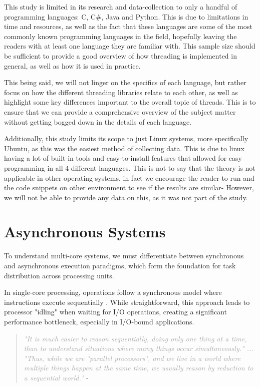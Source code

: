 \documentclass[12pt,a4paper]{article}
\begin{document}
This study is limited in its research and data-collection to only a handful of programming languages: C, C\#, Java and Python. This is due to limitations in time and resources, as well as the fact that these languages are some of the most commonly known programming languages in the field, hopefully leaving the readers with at least one language they are familiar with. This sample size should be sufficient to provide a good overview of how threading is implemented in general, as well as how it is used in practice. 

This being said, we will not linger on the specifics of each language, but rather focus on how the different threading libraries relate to each other, as well as highlight some key differences important to the overall topic of threads. This is to ensure that we can provide a comprehensive overview of the subject matter without getting bogged down in the details of each language.

Additionally, this study limits its scope to just Linux systems, more specifically Ubuntu, as this was the easiest method of collecting data. This is due to linux having a lot of built-in tools and easy-to-install features that allowed for easy programming in all 4 different languages. This is not to say that the theory is not applicable in other operating systems, in fact we encourage the reader to run and the code snippets on other environment to see if the results are similar- However, we will not be able to provide any data on this, as it was not part of the study.

\section{Asynchronous Systems}

To understand multi-core systems, we must differentiate between synchronous and asynchronous execution paradigms, which form the foundation for task distribution across processing units.

In single-core processing, operations follow a synchronous model where instructions execute sequentially \parencite[p. 118]{Johnson2015}. While straightforward, this approach leads to processor "idling" when waiting for I/O operations, creating a significant performance bottleneck, especially in I/O-bound applications.

\begin{quote}
    \textit{\textcolor{darkgray}{"It is much easier to reason sequentially, doing only one thing at a time, than to understand situations where many things occur simultaneously." ... "Thus, while we are "parallel processors", and we live in a world where multiple things happen at the same time, we usually reason by reduction to a sequential world."}} - \cite{Rajsbaum2020}
\end{quote}
\end{document}
